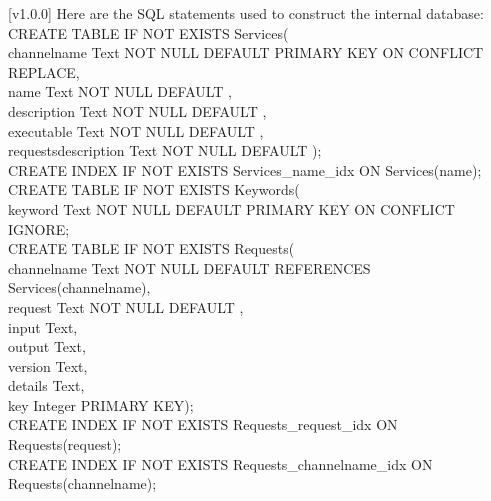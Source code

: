 [v1.0.0]
%
Here are the SQL statements used to construct the internal database:
\outputBegin{}
\settowidth{\utilLen}{CREATE }%
CREATE TABLE IF NOT EXISTS Services(\\
\hspace*{\utilLen}channelname Text NOT NULL DEFAULT \fatUnderscore{} PRIMARY KEY ON CONFLICT REPLACE,\\
\hspace*{\utilLen}name Text NOT NULL DEFAULT \fatUnderscore,\\
\hspace*{\utilLen}description Text NOT NULL DEFAULT \fatUnderscore,\\
\hspace*{\utilLen}executable Text NOT NULL DEFAULT \fatUnderscore,\\
\hspace*{\utilLen}requestsdescription Text NOT NULL DEFAULT \fatUnderscore);\\
CREATE INDEX IF NOT EXISTS Services\_name\_idx ON Services(name);\\
CREATE TABLE IF NOT EXISTS Keywords(\\
\hspace*{\utilLen}keyword Text NOT NULL DEFAULT \fatUnderscore{} PRIMARY KEY ON CONFLICT IGNORE;\\
CREATE TABLE IF NOT EXISTS Requests(\\
\hspace*{\utilLen}channelname Text NOT NULL DEFAULT \fatUnderscore{} REFERENCES Services(channelname),\\
\hspace*{\utilLen}request Text NOT NULL DEFAULT \fatUnderscore,\\
\hspace*{\utilLen}input Text,\\
\hspace*{\utilLen}output Text,\\
\hspace*{\utilLen}version Text,\\
\hspace*{\utilLen}details Text,\\
\hspace*{\utilLen}key Integer PRIMARY KEY);\\
CREATE INDEX IF NOT EXISTS Requests\_request\_idx ON Requests(request);\\
CREATE INDEX IF NOT EXISTS Requests\_channelname\_idx ON Requests(channelname);\\
